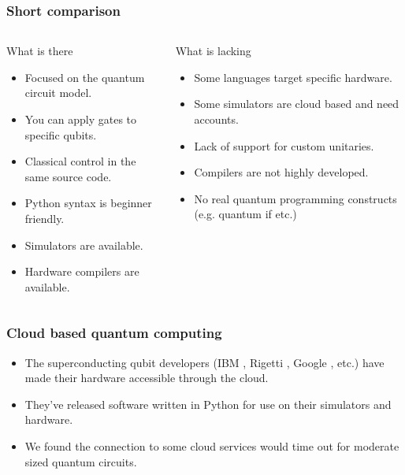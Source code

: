 \documentclass{beamer}
\begin{document}
\begin{frame}
\frametitle{Short comparison}
\begin{columns}
    \begin{block}{What is there}
    \begin{itemize}
        \item Focused on the quantum circuit model.
        \item You can apply gates to specific qubits.
        \item Classical control in the same source code.
        \item Python syntax is beginner friendly.
        \item Simulators are available.
        \item Hardware compilers are available.
    \end{itemize}
    \end{block}
    \begin{block}{What is lacking}
        \begin{itemize}
            \item Some languages target specific hardware.
            \item Some simulators are cloud based and need accounts.
            \item Lack of support for custom unitaries.
            \item Compilers are not highly developed.
            \item No real quantum programming constructs (e.g. quantum if etc.)
        \end{itemize}
        \end{block}
\end{columns}
\end{frame}

\begin{frame}
  \frametitle{Cloud based quantum computing}
  \begin{itemize}
      \item The superconducting qubit developers (IBM \cite{ibmqiskit}, Rigetti \cite{rigetti}, Google \cite{googlecirq}, etc.) have made their hardware accessible through the cloud. 
  \item They've released software written in Python for use on their simulators and hardware.
    \item We found the connection to some cloud services would time out for moderate sized quantum circuits.
  \end{itemize}
\end{frame}
\end{document}
